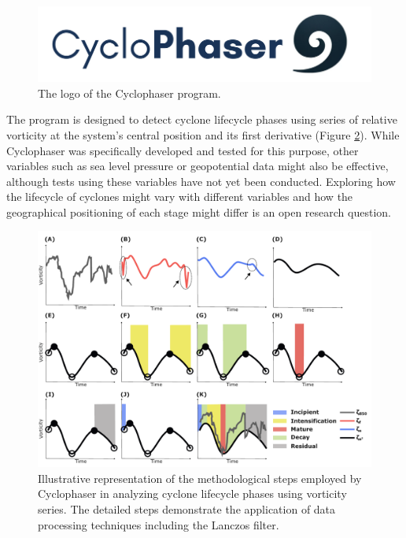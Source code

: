 \begin{figure}[h]
\centering
\includegraphics[width=\linewidth]{figs_3/cyclophaser.png}
\caption[Cyclophaser - Logo]{The logo of the Cyclophaser program.}
\label{fig:cyclophaser_logo}
\end{figure}

The program is designed to detect cyclone lifecycle phases using series of relative vorticity at the system's central position and its first derivative (Figure \ref{fig:/cyclophaser_methodology}). While Cyclophaser was specifically developed and tested for this purpose, other variables such as sea level pressure or geopotential data might also be effective, although tests using these variables have not yet been conducted. Exploring how the lifecycle of cyclones might vary with different variables and how the geographical positioning of each stage might differ is an open research question.

\begin{figure}[h]
\centering
\includegraphics[width=\linewidth]{figs_3/cyclophaser_methodology.pdf}
\caption[Cyclophaser - Methodological Steps]{Illustrative representation of the methodological steps employed by Cyclophaser in analyzing cyclone lifecycle phases using vorticity series. The detailed steps demonstrate the application of data processing techniques including the Lanczos filter.}
\label{fig:/cyclophaser_methodology}
\end{figure}

